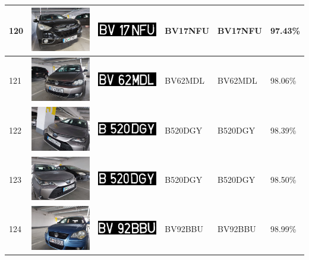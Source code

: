 \documentclass[a4paper,12pt]{report}
\begin{document}
\begin{longtable}{| m{0.6cm} | m{3cm} | m{3cm} | m{1.8cm} | m{1.8cm} | m{1.8cm} |}
        120 & \includegraphics[width=3cm,keepaspectratio]{dataset/70_s1.jpg} & \includegraphics[width=3cm,keepaspectratio]{segmentari/120.jpg} & BV17NFU & BV17NFU & 97.43\% \\ \hline
        121 & \includegraphics[width=3cm,keepaspectratio]{dataset/71_d1.jpg} & \includegraphics[width=3cm,keepaspectratio]{segmentari/121.jpg} & BV62MDL & BV62MDL & 98.06\% \\ \hline
        122 & \includegraphics[width=3cm,keepaspectratio]{dataset/72_d1.jpg} & \includegraphics[width=3cm,keepaspectratio]{segmentari/122.jpg} & B520DGY & B520DGY & 98.39\% \\ \hline
        123 & \includegraphics[width=3cm,keepaspectratio]{dataset/72_s1.jpg} & \includegraphics[width=3cm,keepaspectratio]{segmentari/123.jpg} & B520DGY & B520DGY & 98.50\% \\ \hline
        124 & \includegraphics[width=3cm,keepaspectratio]{dataset/73_d1.jpg} & \includegraphics[width=3cm,keepaspectratio]{segmentari/124.jpg} & BV92BBU & BV92BBU & 98.99\% \\ \hline

\end{longtable}
\end{document}
